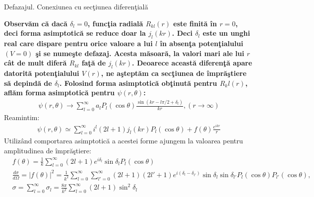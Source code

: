 \begin{frame}[allowframebreaks]{Defazajul. Conexiunea cu sec\c{t}iunea diferen\c{t}ial\u{a}}

{\bf Observ\u{a}m c\u{a} dac\u{a} $\delta_l=0$, func\c{t}ia radial\u{a} $R_{kl}(r)$ este finit\u{a} \^{i}n $r=0$, deci forma asimptotic\u{a} se reduce doar la $j_l(kr)$. Deci $\delta_l$ este un unghi real care dispare pentru orice valoare a lui $l$ \^{i}n absen\c{t}a poten\c{t}ialului $(V=0)$ \c{s}i se nume\c{s}te defazaj. Acesta m\u{a}soar\u{a}, la valori mari ale lui $r$ c\^{a}t de mult difer\u{a} $R_{kl}$ fa\c{t}\u{a} de $j_l(kr)$. Deoarece aceast\u{a} diferen\c{t}\u{a} apare datorit\u{a} poten\c{t}ialului $V(r)$, ne a\c{s}tept\u{a}m ca sec\c{t}iunea de \^{i}mpr\u{a}\c{s}tiere s\u{a} depind\u{a} de $\delta_l$. Folosind forma asimptotic\u{a} ob\c{t}inut\u{a} pentru $R_kl(r)$, afl\u{a}m forma asimptotic\u{a} pentru $\psi(r,\theta)$:}
\begin{align}
\psi(r,\theta)\to\sum_{l=0}^{\infty}a_lP_l(\cos\theta)\frac{\sin(kr-l\pi/2+\delta_l)}{kr},(r\to\infty)
\end{align}
Reamintim:
\begin{align}
\psi(r,\theta)\simeq\sum_{l=0}^{\infty}i^l(2l+1)j_l(kr)P_l(\cos\theta)+f(\theta)\frac{e^{ikr}}{r}
\end{align}
Utiliz\^{a}nd comportarea asimptotic\u{a} a acestei forme ajungem la valoarea pentru amplitudinea de \^{i}mpr\u{a}\c{s}tiere:
\begin{align}
&f(\theta)=\frac{1}{k}\sum_{l=0}^{\infty}(2l+1)e^{i\delta_l}\sin\delta_lP_l(\cos\theta)\\
&\frac{d\sigma}{d\Omega}=|f(\theta)|^2=\frac{1}{k^2}\sum_{l=0}^{\infty}\sum_{l'=0}^{\infty}(2l+1)
(2l'+1)e^{i(\delta_l-\delta_{l'})}\sin\delta_l\sin\delta_{l'}P_l(\cos\theta)P_{l'}(\cos\theta),\\
&\boxed{\sigma=\sum_{l=0}^{\infty}\sigma_l=\frac{8\pi}{k^2}\sum_{l=0}^{\infty}(2l+1)\sin^2\delta_l}
\end{align}

\end{frame} 

